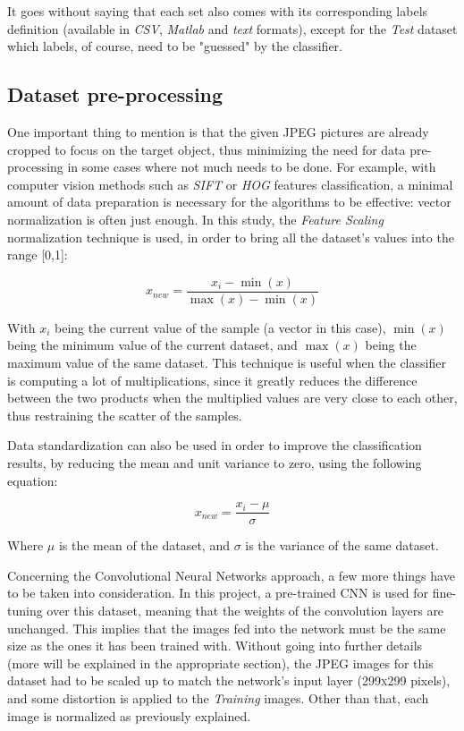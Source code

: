 \documentclass[conference]{IEEEtran}
\begin{document}
It goes without saying that each set also comes with its corresponding labels definition (available in \emph{CSV}, \emph{Matlab} and \emph{text} formats), except for the \emph{Test} dataset which labels, of course, need to be "guessed" by the classifier.


\subsection{Dataset pre-processing}
One important thing to mention is that the given JPEG pictures are already cropped to focus on the target object, thus minimizing the need for data pre-processing in some cases where not much needs to be done. For example, with computer vision methods such as \emph{SIFT} or \emph{HOG} features classification, a minimal amount of data preparation is necessary for the algorithms to be effective: vector normalization is often just enough. In this study, the \emph{Feature Scaling} normalization technique is used, in order to bring all the dataset's values into the range [0,1]:

\begin{equation}
    x_{new}=\frac{x_i-\min(x)}{\max(x)-\min(x)}
\end{equation}

With $x_i$ being the current value of the sample (a vector in this case), $\min(x)$ being the minimum value of the current dataset, and $\max(x)$ being the maximum value of the same dataset. This technique is useful when the classifier is computing a lot of multiplications, since it greatly reduces the difference between the two products when the multiplied values are very close to each other, thus restraining the scatter of the samples.

Data standardization can also be used in order to improve the classification results, by reducing the mean and unit variance to zero, using the following equation:

\begin{equation}
    x_{new}=\frac{x_i-\mu}{\sigma}
\end{equation}

Where $\mu$ is the mean of the dataset, and $\sigma$ is the variance of the same dataset. 

Concerning the Convolutional Neural Networks approach, a few more things have to be taken into consideration. In this project, a pre-trained CNN is used for fine-tuning over this dataset, meaning that the weights of the convolution layers are unchanged. This implies that the images fed into the network must be the same size as the ones it has been trained with. Without going into further details (more will be explained in the appropriate section), the JPEG images for this dataset had to be scaled up to match the network's input layer (\textsc{299x299} pixels), and some distortion is applied to the \emph{Training} images. Other than that, each image is normalized as previously explained.
\end{document}
